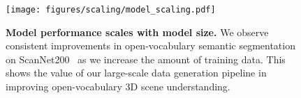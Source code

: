 \begin{figure}[h]
    \centering
    \texttt{[image: figures/scaling/model\_scaling.pdf]}
    \vspace{-2mm}
    \caption{
        \textbf{Model performance scales with model size.}
        We observe consistent improvements in open-vocabulary semantic segmentation on ScanNet200~\cite{scannet200} as we increase the amount of training data.
        This shows the value of our large-scale data generation pipeline in improving open-vocabulary 3D scene understanding.
    }
    \label{fig:model_scaling}
\end{figure}
